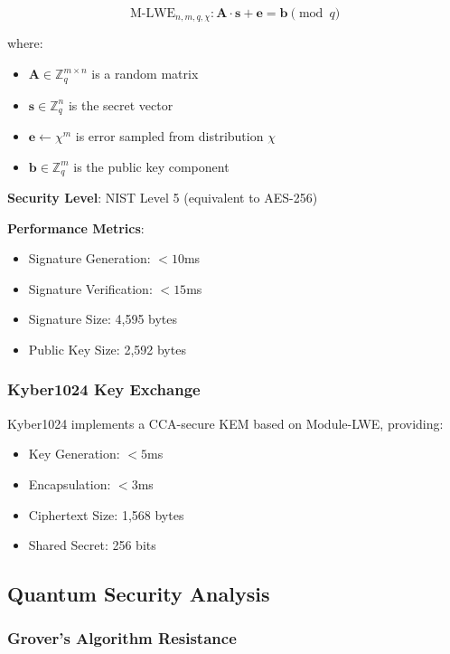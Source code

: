\documentclass[11pt,a4paper]{article}
\begin{document}
\begin{equation}
\text{M-LWE}_{n,m,q,\chi}: \mathbf{A} \cdot \mathbf{s} + \mathbf{e} = \mathbf{b} \pmod{q}
\end{equation}

where:
\begin{itemize}
    \item $\mathbf{A} \in \mathbb{Z}_q^{m \times n}$ is a random matrix
    \item $\mathbf{s} \in \mathbb{Z}_q^n$ is the secret vector
    \item $\mathbf{e} \leftarrow \chi^m$ is error sampled from distribution $\chi$
    \item $\mathbf{b} \in \mathbb{Z}_q^m$ is the public key component
\end{itemize}

\textbf{Security Level}: NIST Level 5 (equivalent to AES-256)

\textbf{Performance Metrics}:
\begin{itemize}
    \item Signature Generation: $<10$ms
    \item Signature Verification: $<15$ms
    \item Signature Size: 4,595 bytes
    \item Public Key Size: 2,592 bytes
\end{itemize}

\subsubsection{Kyber1024 Key Exchange}

Kyber1024 implements a CCA-secure KEM based on Module-LWE, providing:
\begin{itemize}
    \item Key Generation: $<5$ms
    \item Encapsulation: $<3$ms
    \item Ciphertext Size: 1,568 bytes
    \item Shared Secret: 256 bits
\end{itemize}

\subsection{Quantum Security Analysis}

\subsubsection{Grover's Algorithm Resistance}
\end{document}
